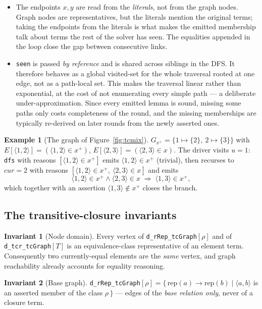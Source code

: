 \documentclass[11pt,a4paper]{article}
\newcommand{\code}[1]{\texttt{\small #1}}
\newcommand{\tup}[1]{\langle #1 \rangle}
\newcommand{\tc}[1]{{#1}^{+}}
\newcommand{\rep}[1]{\mathrm{rep}(#1)}
\theoremstyle{definition}
\newtheorem{invariant}{Invariant}
\newtheorem{example}{Example}
\begin{document}
\begin{itemize}[leftmargin=*,itemsep=1pt]
\item The endpoints $x,y$ are read from the \emph{literals}, not from the graph
  nodes. Graph nodes are representatives, but the literals mention the original
  terms; taking the endpoints from the literals is what makes the emitted
  membership talk about terms the rest of the solver has seen. The equalities
  appended in the loop close the gap between consecutive links.
\item \code{seen} is passed \emph{by reference} and is shared across siblings in
  the DFS. It therefore behaves as a global visited-set for the whole traversal
  rooted at one edge, not as a path-local set. This makes the traversal linear
  rather than exponential, at the cost of not enumerating every simple path ---
  a deliberate under-approximation. Since every emitted lemma is sound, missing
  some paths only costs completeness of the round, and the missing memberships
  are typically re-derived on later rounds from the newly asserted ones.
\end{itemize}

\begin{example}[The graph of Figure~\ref{fig:tcmix}]
$G_{\tc{x}} = \{1\mapsto\{2\},\ 2\mapsto\{3\}\}$ with
$E[\tup{1,2}] = (\tup{1,2}\in\tc{x})$, $E[\tup{2,3}]=(\tup{2,3}\in x)$.
The driver visits $u=1$: \code{dfs} with reasons $[\tup{1,2}\in\tc{x}]$ emits
$\tup{1,2}\in\tc{x}$ (trivial), then recurses to $\mathit{cur}=2$ with reasons
$[\tup{1,2}\in\tc{x},\ \tup{2,3}\in x]$ and emits
\[
  \tup{1,2}\in\tc{x} \wedge \tup{2,3}\in x \;\Rightarrow\; \tup{1,3}\in\tc{x},
\]
which together with an assertion $\tup{1,3}\notin\tc{x}$ closes the branch.
\end{example}

\subsection{The transitive-closure invariants}

\begin{invariant}[Node domain]\label{inv:nodes}
Every vertex of \code{d\_rRep\_tcGraph}$[\rho]$ and of
\code{d\_tcr\_tcGraph}$[T]$ is an equivalence-class representative of an element
term. Consequently two currently-equal elements are the \emph{same} vertex, and
graph reachability already accounts for equality reasoning.
\end{invariant}

\begin{invariant}[Base graph]\label{inv:base}
\code{d\_rRep\_tcGraph}$[\rho] = \{\,\rep{a}\to\rep{b} \mid \tup{a,b}$ is an
asserted member of the class $\rho\,\}$ --- edges of the \emph{base relation
only}, never of a closure term.
\end{invariant}
\end{document}
